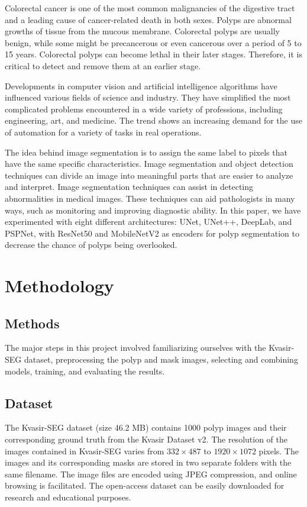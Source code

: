 \documentclass[12pt]{article}
\begin{document}
	Colorectal cancer is one of the most common malignancies of the digestive tract and a leading cause of cancer-related death in both sexes. Polyps are abnormal growths of tissue from the mucous membrane. Colorectal polyps are usually benign, while some might be precancerous or even cancerous over a period of 5 to 15 years. Colorectal polyps can become lethal in their later stages. Therefore, it is critical to detect and remove them at an earlier stage.

Developments in computer vision and artificial intelligence algorithms have influenced various fields of science and industry. They have simplified the most complicated problems encountered in a wide variety of professions, including engineering, art, and medicine. The trend shows an increasing demand for the use of automation for a variety of tasks in real operations.

The idea behind image segmentation is to assign the same label to pixels that have the same specific characteristics. Image segmentation and object detection techniques can divide an image into meaningful parts that are easier to analyze and interpret. Image segmentation techniques can assist in detecting abnormalities in medical images. These techniques can aid pathologists in many ways, such as monitoring and improving diagnostic ability. In this paper, we have experimented with eight different architectures: UNet, UNet++, DeepLab, and PSPNet, with ResNet50 and MobileNetV2 as encoders for polyp segmentation to decrease the chance of polyps being overlooked.


	\section{Methodology}
	
	\subsection{Methods}
	The major steps in this project involved familiarizing ourselves with the Kvasir-SEG dataset, preprocessing the polyp and mask images, selecting and combining models, training, and evaluating the results.

	\subsection{Dataset}
	The Kvasir-SEG dataset (size 46.2 MB) contains 1000 polyp images and their corresponding ground truth from the Kvasir Dataset v2. The resolution of the images contained in Kvasir-SEG varies from $332 \times 487$ to $1920 \times 1072$ pixels. The images and its corresponding masks are stored in two separate folders with the same filename. The image files are encoded using JPEG compression, and online browsing is facilitated. The open-access dataset can be easily downloaded for research and educational purposes.
\end{document}
